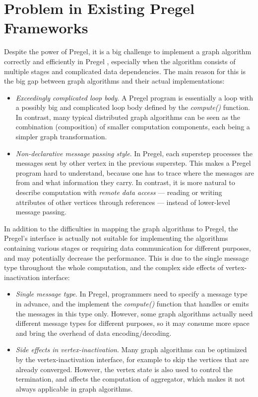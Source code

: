 \documentclass{sokendai_thesis} %
\begin{document}
\section{Problem in Existing Pregel Frameworks}

Despite the power of Pregel, it is a big challenge to implement a graph algorithm correctly and efficiently in Pregel \cite{connectivity}, especially when the algorithm consists of multiple stages and complicated data dependencies.
The main reason for this is the big gap between graph algorithms and their actual implementations:

\begin{itemize}
\item
 \textit{Exceedingly complicated loop body}.
 A Pregel program is essentially a loop with a possibly big and complicated loop body defined by the \emph{compute()} function.
 In contrast, many typical distributed graph algorithms can be seen as the combination (composition) of smaller computation components, each being a simpler graph transformation.
\item
 \textit{Non-declarative message passing style}.
 In Pregel, each superstep processes the messages sent by other vertex in the previous superstep.
 This makes a Pregel program hard to understand, because one has to trace where the messages are from and what information they carry.
 In contrast, it is more natural to describe computation with \emph{remote data access} --- reading or writing attributes of other vertices through references --- instead of lower-level message passing.
\end{itemize}

In addition to the difficulties in mapping the graph algorithms to Pregel, the Pregel's interface is actually not suitable for implementing the algorithms containing various stages or requiring data communication for different purposes, and may potentially decrease the performance.
This is due to the single message type throughout the whole computation, and the complex side effects of vertex-inactivation interface:
\begin{itemize}
\item
 \textit{Single message type}.
 In Pregel, programmers need to specify a message type in advance, and the implement the \emph{compute()} function that handles or emits the messages in this type only.
 However, some graph algorithms actually need different message types for different purposes, so it may consume more space and bring the overhead of data encoding/decoding.
\item
 \textit{Side effects in vertex-inactivation}.
 Many graph algorithms can be optimized by the vertex-inactivation interface, for example to skip the vertices that are already converged.
 However, the vertex state is also used to control the termination, and affects the computation of aggregator, which makes it not always applicable in graph algorithms.
\end{itemize}
\end{document}
